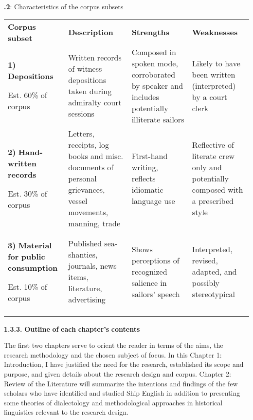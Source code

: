 \begin{styleNormali}
\textbf{.2}: Characteristics of the corpus subsets 
\end{styleNormali}

\tablefirsthead{}

\tabletail{}
\tablelasttail{}
\begin{tabularx}{\textwidth}{XXXX}

\lsptoprule

\textbf{Corpus} \textbf{subset} & \textbf{Description} & \textbf{Strengths} & \textbf{Weaknesses}\\
\textbf{1)} \textbf{Depositions}

Est. 60\% of corpus & Written records of witness depositions taken during admiralty court sessions & Composed in spoken mode, corroborated by speaker and includes potentially illiterate sailors & Likely to have been written (interpreted) by a court clerk\\
\textbf{2)} \textbf{Hand-written} \textbf{records}

Est. 30\% of corpus & Letters, receipts, log books and misc. documents of personal grievances, vessel movements, manning, trade & First-hand writing, reflects idiomatic language use & Reflective of literate crew only and potentially composed with a prescribed style\\
\textbf{3)} \textbf{Material} \textbf{for} \textbf{public} \textbf{consumption}

Est. 10\% of corpus & Published sea-shanties, journals, news items, literature, advertising & Shows perceptions of recognized salience in sailors’ speech & Interpreted, revised, adapted, and possibly stereotypical \\
\lspbottomrule
\end{tabularx}
\begin{styleNormali}
\textbf{1.3.3.} \textbf{Outline} \textbf{of} \textbf{each} \textbf{chapter’s} \textbf{contents}
\end{styleNormali}

\begin{styleNormali}
  The first two chapters serve to orient the reader in terms of the aims, the research methodology and the chosen subject of focus. In this Chapter 1: Introduction, I have justified the need for the research, established its scope and purpose, and given details about the research design and corpus. Chapter 2: Review of the Literature will summarize the intentions and findings of the few scholars who have identified and studied Ship English in addition to presenting some theories of dialectology and methodological approaches in historical linguistics relevant to the research design. 
\end{styleNormali}


